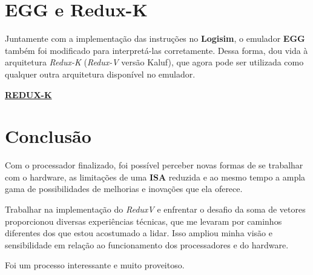 \documentclass{article}  %
\begin{document}
    \clearpage
    \section{EGG e Redux-K}

    Juntamente com a implementação das instruções no \textbf{Logisim}, o emulador \textbf{EGG} também foi modificado para interpretá-las corretamente.
    Dessa forma, dou vida à arquitetura \textit{Redux-K} (\textit{Redux-V} versão Kaluf), que agora pode ser utilizada como qualquer outra arquitetura disponível no emulador.
    \vspace{1cm}

    \href{https://github.com/Eduardo-Kaluf/redux-K}{\textbf{REDUX-K}}

    \section{Conclusão}

    Com o processador finalizado, foi possível perceber novas formas de se trabalhar com o hardware, as limitações de uma \textbf{ISA} reduzida e ao mesmo tempo a ampla gama de possibilidades de melhorias e inovações que ela oferece.

    Trabalhar na implementação do \textit{ReduxV} e enfrentar o desafio da soma de vetores proporcionou diversas experiências técnicas, que me levaram por caminhos diferentes dos que estou acostumado a lidar. Isso ampliou minha visão e sensibilidade em relação ao funcionamento dos processadores e do hardware.
    
    Foi um processo interessante e muito proveitoso. 
\end{document}

